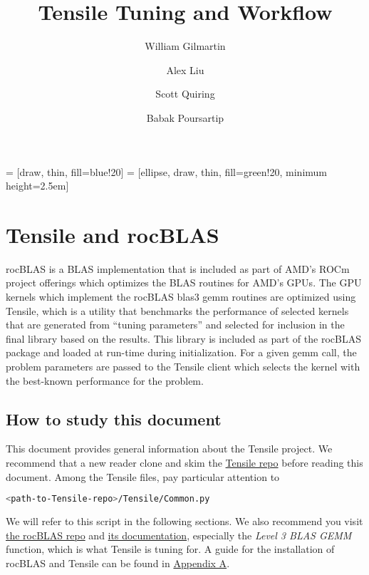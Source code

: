 \documentclass[]{article}
\title{Tensile Tuning and Workflow}
\author{William Gilmartin \and Alex Liu \and Scott Quiring \and Babak Poursartip}
\begin{document}
\maketitle

\newpage

\tableofcontents



 = [draw, thin, fill=blue!20]
 = [ellipse, draw, thin, fill=green!20, minimum height=2.5em]

\newpage

\section{Tensile and rocBLAS}


rocBLAS is a BLAS implementation that is included as part of AMD's ROCm project offerings which optimizes the BLAS routines for AMD's GPUs. The GPU kernels which implement the rocBLAS blas3 gemm routines are optimized using Tensile, which is a utility that benchmarks the performance of selected kernels that are generated from ``tuning parameters'' and selected for inclusion in the final library based on the results. This library is included as part of the rocBLAS package and loaded at run-time during initialization. For a given gemm call, the problem parameters are passed to the Tensile client which selects the kernel with the best-known performance for the problem.


\subsection{How to study this document}
This document provides general information about the Tensile project. We recommend that a new reader clone and skim the \href{https://github.com/ROCmSoftwarePlatform/Tensile}{Tensile repo} before reading this document. Among the Tensile files, pay particular attention to 

\begin{lstlisting}[language=bash,breaklines=true]
<path-to-Tensile-repo>/Tensile/Common.py
\end{lstlisting}

\noindent We will refer to this script in the following sections. We also recommend you visit \href{https://github.com/ROCmSoftwarePlatform/rocBLAS}{the rocBLAS repo} and \href{https://rocblas.readthedocs.io/en/rocm-4.5.0/}{its documentation}, especially the \textit{Level 3 BLAS GEMM} function, which is what Tensile is tuning for. A guide for the installation of rocBLAS and Tensile can be found in \hyperref[sec:appendixA]{Appendix A}.
\end{document}
